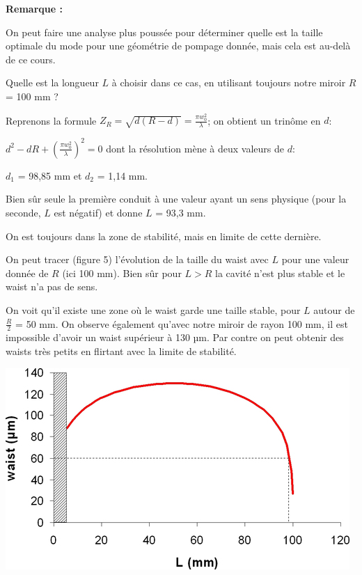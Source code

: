 \documentclass{book}
\begin{document}
\textbf{\color{remarque1}Remarque :}  
\begin{mdframed}[linecolor=remarque1, backgroundcolor=remarque2]

On peut faire une analyse plus poussée pour déterminer quelle est la taille optimale du mode pour une géométrie de pompage donnée, mais cela est au-delà de ce cours.

\end{mdframed}

Quelle est la longueur \(L\) à choisir dans ce cas, en utilisant toujours notre miroir \(R\) = 100 mm ?

Reprenons la formule \(Z_R=\sqrt{d(R-d)}=\frac{\pi w_0^2}\lambda\); on obtient un trinôme en \(d\):

\(d^2-dR+\left(\frac{\pi w_0^2}\lambda \right) ^2=0\) dont la résolution mène à deux valeurs de \(d\):

\(d_1\) = 98,85 mm et \(d_2\) = 1,14 mm.

Bien sûr seule la première conduit à une valeur ayant un sens physique (pour la seconde, \(L\) est négatif) et donne \(L\) = 93,3 mm.

On est toujours dans la zone de stabilité, mais en limite de cette dernière.

On peut tracer (figure 5) l'évolution de la taille du waist avec \(L\) pour une valeur donnée de \(R\) (ici 100 mm). Bien sûr pour \(L > R\) la cavité n'est plus stable et le waist n'a pas de sens.

On voit qu'il existe une zone où le waist garde une taille stable, pour \(L\) autour de \(\frac R2\) = 50 mm. On observe également qu'avec notre miroir de rayon 100 mm, il est impossible d'avoir un waist supérieur à 130 µm. Par contre on peut obtenir des waists très petits en flirtant avec la limite de stabilité.

{\centering
\includegraphics[scale=1.7]{images/EC_Fig5.jpg}
\par}
\end{document}
